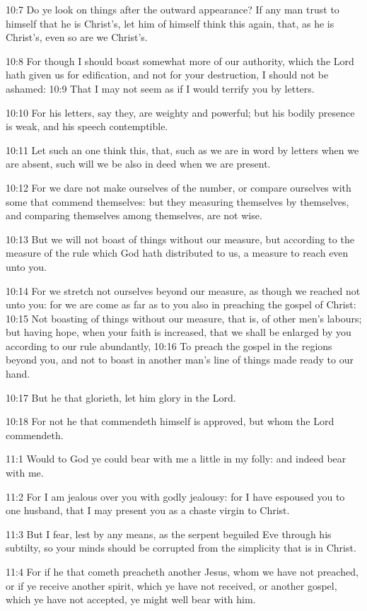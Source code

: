10:7 Do ye look on things after the outward appearance? If any man trust to himself that he is Christ's, let him of himself think this again, that, as he is Christ's, even so are we Christ's.

10:8 For though I should boast somewhat more of our authority, which the Lord hath given us for edification, and not for your destruction, I should not be ashamed: 10:9 That I may not seem as if I would terrify you by letters.

10:10 For his letters, say they, are weighty and powerful; but his bodily presence is weak, and his speech contemptible.

10:11 Let such an one think this, that, such as we are in word by letters when we are absent, such will we be also in deed when we are present.

10:12 For we dare not make ourselves of the number, or compare ourselves with some that commend themselves: but they measuring themselves by themselves, and comparing themselves among themselves, are not wise.

10:13 But we will not boast of things without our measure, but according to the measure of the rule which God hath distributed to us, a measure to reach even unto you.

10:14 For we stretch not ourselves beyond our measure, as though we reached not unto you: for we are come as far as to you also in preaching the gospel of Christ: 10:15 Not boasting of things without our measure, that is, of other men's labours; but having hope, when your faith is increased, that we shall be enlarged by you according to our rule abundantly, 10:16 To preach the gospel in the regions beyond you, and not to boast in another man's line of things made ready to our hand.

10:17 But he that glorieth, let him glory in the Lord.

10:18 For not he that commendeth himself is approved, but whom the Lord commendeth.

11:1 Would to God ye could bear with me a little in my folly: and indeed bear with me.

11:2 For I am jealous over you with godly jealousy: for I have espoused you to one husband, that I may present you as a chaste virgin to Christ.

11:3 But I fear, lest by any means, as the serpent beguiled Eve through his subtilty, so your minds should be corrupted from the simplicity that is in Christ.

11:4 For if he that cometh preacheth another Jesus, whom we have not preached, or if ye receive another spirit, which ye have not received, or another gospel, which ye have not accepted, ye might well bear with him.

